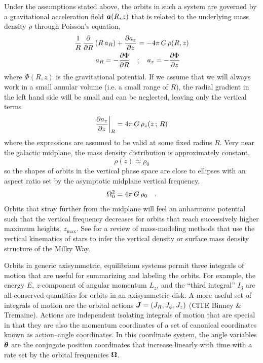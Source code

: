 Under the assumptions stated above, the orbits in such a system are governed by a
gravitational acceleration field $\boldsymbol{a}(R, z)$ that is related to the underlying mass
density $\rho$ through Poisson's equation,
\begin{align}
    \frac{1}{R} \, \frac{\partial {}}{\partial {R}}\left(R \, a_R\right) + \frac{\partial {a_z}}{\partial {z}}
        &= - 4\pi \, G \, \rho(R, z) \\
    a_R = -\frac{\partial {\Phi}}{\partial {R}} \quad &; \quad a_z = -\frac{\partial {\Phi}}{\partial {z}}
\end{align}
where $\Phi(R, z)$ is the gravitational potential.
If we assume that we will always work in a small annular volume (i.e. a small range of
$R$), the radial gradient in the left hand side will be small and can be neglected,
leaving only the vertical terms
\begin{equation}
    \frac{\partial {a_z}}{\partial {z}}\biggr\rvert_R = 4\pi \, G \, \rho_z(z \,;\, R)
\end{equation}
where the expressions are assumed to be valid at some fixed radius $R$.
Very near the galactic midplane, the mass density distribution is approximately
constant,
\begin{equation}
    \rho(z) \approx \rho_0
\end{equation}
so the shapes of orbits in the vertical phase space are close to ellipses with an aspect
ratio set by the asymptotic midplane vertical frequency,
\begin{equation}
    \Omega_0^2 = 4\pi\,G \, \rho_0 \quad . \label{eq:freqzero}
\end{equation}
Orbits that stray further from the midplane will feel an anharmonic potential such that
the vertical frequency decreases for orbits that reach successively higher maximum
heights, $z_{\textrm{max}}$.
See \citet{Read:2014} for a review of mass-modeling methods that use the vertical
kinematics of stars to infer the vertical density or surface mass density structure of
the Milky Way.

Orbits in generic axisymmetric, equilibrium systems permit three integrals of motion
that are useful for summarizing and labeling the orbits.
For example, the energy $E$, $z$-component of angular momentum $L_z$, and the ``third
integral'' $I_3$ are all conserved quantities for orbits in an axisymmetric disk.
A more useful set of integrals of motion are the orbital actions $\boldsymbol{J} = (J_R,
J_\phi, J_z)$ (CITE Binney \& Tremaine).
Actions are independent isolating integrals of motion that are special in that they are
also the momentum coordinates of a set of canonical coordinates known as action--angle
coordinates.
In this coordinate system, the angle variables $\boldsymbol{\theta}$ are the conjugate position
coordinates that increase linearly with time with a rate set by the orbital frequencies
$\boldsymbol{\Omega}$.

